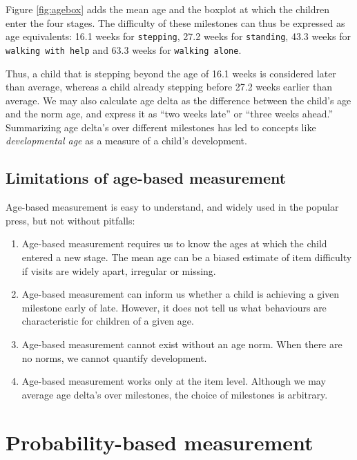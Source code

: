 \documentclass[
]{book}
\providecommand{\tightlist}{%
  \setlength{\itemsep}{0pt}\setlength{\parskip}{0pt}}
\begin{document}
Figure \ref{fig:agebox} adds the mean age and the boxplot at which the children enter the four stages. The difficulty of these milestones can thus be expressed as age equivalents: 16.1 weeks for \texttt{stepping}, 27.2 weeks for \texttt{standing}, 43.3 weeks for \texttt{walking\ with\ help} and 63.3 weeks for \texttt{walking\ alone}.

Thus, a child that is stepping beyond the age of 16.1 weeks is considered later than average, whereas a child already stepping before 27.2 weeks earlier than average. We may also calculate age delta as the difference between the child's age and the norm age, and express it as ``two weeks late'' or ``three weeks ahead.'' Summarizing age delta's over different milestones has led to concepts like \emph{developmental age} as a measure of a child's development.

\hypertarget{limitations-of-age-based-measurement}{%
\subsection{Limitations of age-based measurement}\label{limitations-of-age-based-measurement}}

Age-based measurement is easy to understand, and widely used in the popular press, but not without pitfalls:

\begin{enumerate}
\def\labelenumi{\arabic{enumi}.}
\tightlist
\item
  Age-based measurement requires us to know the ages at which the child entered a new stage. The mean age can be a biased estimate of item difficulty if visits are widely apart, irregular or missing.
\item
  Age-based measurement can inform us whether a child is achieving a given milestone early of late. However, it does not tell us what behaviours are characteristic for children of a given age.
\item
  Age-based measurement cannot exist without an age norm. When there are no norms, we cannot quantify development.
\item
  Age-based measurement works only at the item level. Although we may average age delta's over milestones, the choice of milestones is arbitrary.
\end{enumerate}

\hypertarget{sec:probbased}{%
\section{Probability-based measurement}\label{sec:probbased}}
\end{document}
